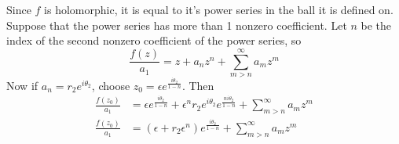\documentclass{homework}
\begin{document}
                                                                                                                                                                                                                                                                              \begin{solution}
                                                                                                                                                                                                                                                                              Since $f$ is holomorphic, it is equal to it's power series in the ball it is defined on. Suppose that the power series has more than 1 nonzero coefficient. Let $n$ be the index of the second nonzero coefficient of the power series, so
                                                                                                                                                                                                                                                                              \[\frac{f(z)}{a_1} = z + a_nz^n + \sum_{m>n}^\infty a_mz^m\]
                                                                                                                                                                                                                                                                              Now if $a_n = r_2e^{i\theta_2}$, choose $z_0 = \epsilon e^{\frac{i\theta_2}{1-n}}$. Then 
                                                                                                                                                                                                                                                                              \begin{align*}
                                                                                                                                                                                                                                                                              \frac{f(z_0)}{a_1} &= \epsilon e^{\frac{i\theta_2}{1-n}} + \epsilon^n r_2e^{i\theta_2}e^{\frac{ni\theta_2}{1-n}} + \sum_{m>n}^\infty a_mz^m\\
                                                                                                                                                                                                                                                                              \frac{f(z_0)}{a_1} &= (\epsilon+r_2\epsilon^n)e^{\frac{i\theta_2}{1-n}} + \sum_{m>n}^\infty a_mz^m\\

\end{align*}
\end{solution}
\end{document}
